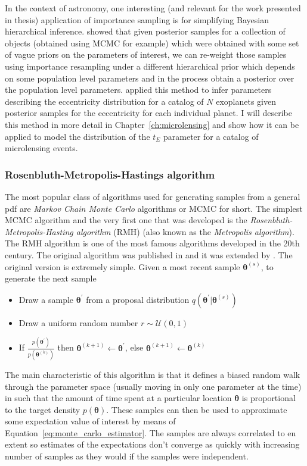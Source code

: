 \documentclass[12pt,dvipsnames]{report}
\renewcommand{\vec}[1]{\boldsymbol{\mathbf{#1}}}
\begin{document}
In the context of astronomy, one  interesting (and relevant for the work presented 
in thesis) application of importance sampling is for simplifying Bayesian hierarchical 
inference. \citet{2010ApJ...725.2166H} showed that given posterior samples for a 
collection of objects (obtained using MCMC for example) which were obtained with some 
set of vague priors on the parameters of interest, we can re-weight those samples using 
importance resampling under a different hierarchical prior which depends on some 
population level parameters and in the process obtain a posterior over the population 
level parameters. \citet{2010ApJ...725.2166H} applied this method to infer parameters 
describing the eccentricity  distribution for a catalog of $N$ exoplanets given 
posterior samples for the eccentricity for each individual planet. I will describe 
this method in more detail in Chapter~\ref{ch:microlensing} and show how it can be
applied to model the distribution of the $t_E$ parameter for a catalog of microlensing 
events.

\subsubsection{Rosenbluth-Metropolis-Hastings algorithm}
The most popular class of algorithms used for generating samples 
from a general pdf are 
\textsl{Markov Chain Monte Carlo} algorithms or MCMC for short. The simplest 
MCMC algorithm and the very first one that was developed is the
\textsl{Rosenbluth-Metropolis-Hasting algorithm} (RMH) (also known as the 
\textsl{Metropolis algorithm}). The RMH algorithm is one of 
the most famous algorithms developed in the 20th century. The original algorithm was 
published in \citet{1953JChPh..21.1087M} and it was extended by 
\citet{1970Bimka..57...97H}. The original version is extremely simple. 
Given a most recent sample $\vec\theta^{(s)}$, to generate the next sample
\begin{itemize}
    \item Draw a sample $\vec{\theta}^\prime$ from a proposal distribution $q(\bm\theta^\prime\lvert\vec\theta^{(s)})$ 
    \item Draw a uniform random number $r\sim\mathcal{U}(0,1)$
    \item If $\frac{p(\bm\theta^\prime)}{p(\vec\theta^{(k)})}$ then $\bm\theta^{(k+1)}\leftarrow \bm\theta^\prime$, else $\bm\theta^{(k+1)}\leftarrow\bm\theta^{(k)}$
\end{itemize}
The main characteristic of this algorithm is that it defines a biased random walk
through the parameter space (usually moving in only one parameter at the time) 
in such that the amount of time spent at a particular location $\vec\theta$ is 
proportional to the target density $p(\vec\theta)$.
These samples can then be used to approximate some expectation value of interest 
by means of Equation~\ref{eq:monte_carlo_estimator}. The samples are always correlated 
to en extent so estimates of the expectations don't converge as quickly with increasing 
number of samples as they would if the samples were independent.
\end{document}
